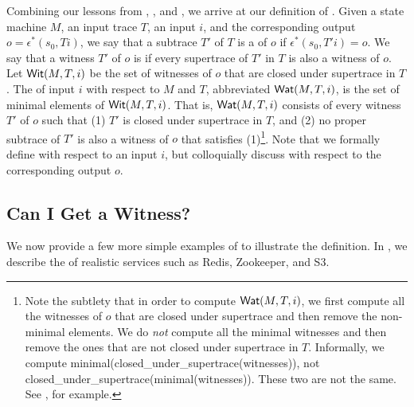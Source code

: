 Combining our lessons from ,
, and , we arrive
at our definition of \watprovenance{}. Given a state machine $M$, an input
trace $T$, an input $i$, and the corresponding output $o = \epsilon^*(s_0,
Ti)$, we say that a subtrace $T'$ of $T$ is a  of $o$ if
$\epsilon^*(s_0, T'i) = o$. We say that a witness $T'$ of $o$ is
 if every supertrace of $T'$ in $T$ is
also a witness of $o$. Let $\textsf{Wit}(M, T, i)$ be the set of witnesses of $o$ that
are closed under supertrace in $T$. The  of input $i$
with respect to $M$ and $T$, abbreviated $\textsf{Wat}(M, T, i)$, is the set of minimal
elements of $\textsf{Wit}(M, T, i)$. That is, $\textsf{Wat}(M, T, i)$ consists of every witness
$T'$ of $o$ such that (1) $T'$ is closed under supertrace in $T$, and (2) no
proper subtrace of $T'$ is also a witness of $o$ that satisfies (1)\footnote{%
  Note the subtlety that in order to compute $\textsf{Wat}(M, T, i)$, we first compute
  all the witnesses of $o$ that are closed under supertrace and then remove the
  non-minimal elements. We do \emph{not} compute all the minimal witnesses and
  then remove the ones that are not closed under supertrace in $T$.
  Informally, we compute minimal(closed\_under\_supertrace(witnesses)), not
  closed\_under\_supertrace(minimal(witnesses)).
  These two are not the same. See , for example.
}. Note that we formally define \watprovenance{} with respect to an input $i$,
but colloquially discuss \watprovenance{} with respect to the corresponding
output $o$.

\subsection{Can I Get a Witness?}
We now provide a few more simple examples of \watprovenance{} to illustrate
the definition. In , we describe the \watprovenance{} of
realistic services such as Redis, Zookeeper, and S3.

